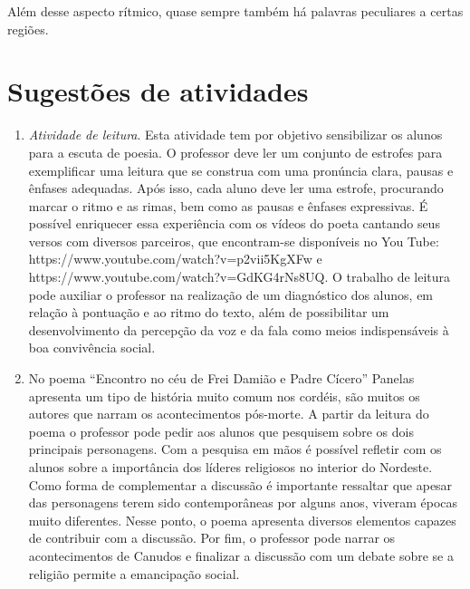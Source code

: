 Além desse aspecto rítmico, quase sempre também há palavras peculiares a
certas regiões. 

\section{Sugestões de atividades}
\begin{enumerate}



\item \textit{Atividade de leitura}. Esta atividade tem por objetivo sensibilizar os
alunos para a escuta de poesia. O professor deve ler um conjunto de
estrofes para exemplificar uma leitura que se construa com uma
pronúncia clara, pausas e ênfases adequadas. Após isso, cada aluno deve
ler uma estrofe, procurando marcar o ritmo e as rimas, bem como as
pausas e ênfases expressivas. É possível enriquecer essa experiência
com os vídeos do poeta cantando seus versos com diversos parceiros, que
encontram-se disponíveis no You Tube:
https://www.youtube.com/watch?v=p2vii5KgXFw e
https://www.youtube.com/watch?v=GdKG4rNs8UQ. O trabalho de leitura pode
auxiliar o professor na realização de um diagnóstico dos alunos, em
relação à pontuação e ao ritmo do texto, além de possibilitar um
desenvolvimento da percepção da voz e da fala como meios indispensáveis
à boa convivência social.

\item No poema ``Encontro no céu de Frei Damião e Padre
Cícero'' Panelas apresenta um tipo de história muito
comum nos cordéis, são muitos os autores que narram os acontecimentos
pós-morte. A partir da leitura do poema o professor pode pedir aos
alunos que pesquisem sobre os dois principais personagens. Com a
pesquisa em mãos é possível refletir com os alunos sobre a importância
dos líderes religiosos no interior do Nordeste. Como forma de
complementar a discussão é importante ressaltar que apesar das
personagens terem sido contemporâneas por alguns anos, viveram épocas
muito diferentes. Nesse ponto, o poema apresenta diversos elementos
capazes de contribuir com a discussão. Por fim, o professor pode
narrar os acontecimentos de Canudos e finalizar a discussão com um
debate sobre se a religião permite a emancipação social.


\end{enumerate}
